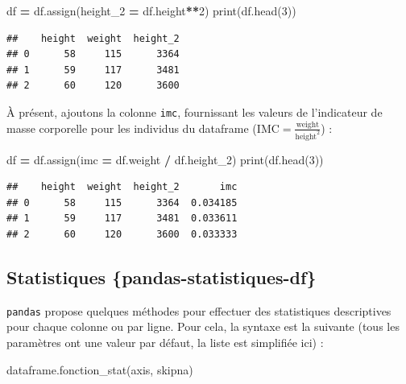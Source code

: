 \documentclass[12pt,]{book}
\newenvironment{Shaded}{\begin{snugshade}}{\end{snugshade}}
\newcommand{\DecValTok}[1]{\textcolor[rgb]{0.00,0.00,0.81}{#1}}
\newcommand{\OperatorTok}[1]{\textcolor[rgb]{0.81,0.36,0.00}{\textbf{#1}}}
\newcommand{\BuiltInTok}[1]{#1}
\newcommand{\NormalTok}[1]{#1}
\numberwithin{equation}{section}
\numberwithin{countremarque}{section}
\begin{document}
\begin{Shaded}
\begin{Highlighting}[]
\NormalTok{df }\OperatorTok{=}\NormalTok{ df.assign(height_2 }\OperatorTok{=}\NormalTok{ df.height}\OperatorTok{**}\DecValTok{2}\NormalTok{)}
\BuiltInTok{print}\NormalTok{(df.head(}\DecValTok{3}\NormalTok{))}
\end{Highlighting}
\end{Shaded}

\begin{lstlisting}
##    height  weight  height_2
## 0      58     115      3364
## 1      59     117      3481
## 2      60     120      3600
\end{lstlisting}

À présent, ajoutons la colonne \texttt{imc}, fournissant les valeurs de
l'indicateur de masse corporelle pour les individus du dataframe
(\(\text{IMC} = \frac{\text{weight}}{\text{height}^2}\)) :

\begin{Shaded}
\begin{Highlighting}[]
\NormalTok{df }\OperatorTok{=}\NormalTok{ df.assign(imc }\OperatorTok{=}\NormalTok{ df.weight }\OperatorTok{/}\NormalTok{ df.height_2)}
\BuiltInTok{print}\NormalTok{(df.head(}\DecValTok{3}\NormalTok{))}
\end{Highlighting}
\end{Shaded}

\begin{lstlisting}
##    height  weight  height_2       imc
## 0      58     115      3364  0.034185
## 1      59     117      3481  0.033611
## 2      60     120      3600  0.033333
\end{lstlisting}

\subsection{Statistiques
\{pandas-statistiques-df\}}\label{statistiques-pandas-statistiques-df}

\texttt{pandas} propose quelques méthodes pour effectuer des
statistiques descriptives pour chaque colonne ou par ligne. Pour cela,
la syntaxe est la suivante (tous les paramètres ont une valeur par
défaut, la liste est simplifiée ici) :

\begin{Shaded}
\begin{Highlighting}[]
\NormalTok{dataframe.fonction_stat(axis, skipna)}
\end{Highlighting}
\end{Shaded}
\end{document}
